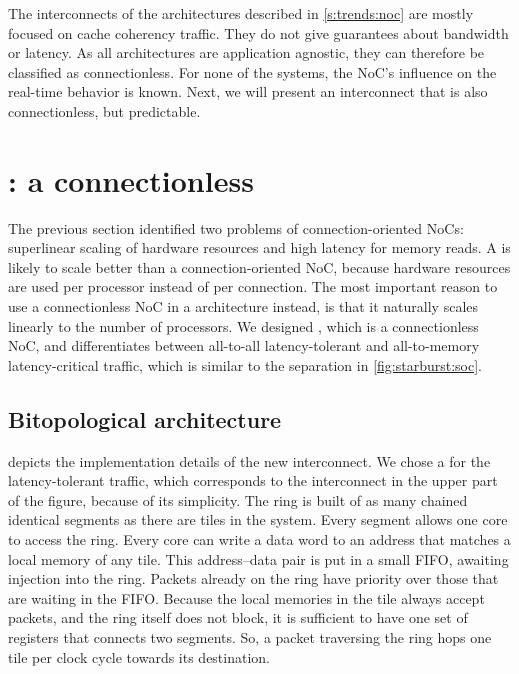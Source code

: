 The interconnects of the architectures described in \cref{s:trends:noc} are mostly focused on cache coherency traffic.
They do not give guarantees about bandwidth or latency.
As all architectures are application agnostic, they can therefore be classified as connectionless.
For none of the systems, the \ac{NoC}'s influence on the real-time behavior is known.
Next, we will present an interconnect that is also connectionless, but predictable.


\section{\Warpfield: a connectionless }
\label{s:hardware:warpfield}

The previous section identified two problems of connection-oriented \acp{NoC}: superlinear scaling of hardware resources and high latency for memory reads.
A   is likely to scale better than a connection-oriented \ac{NoC}, because hardware resources are used per processor instead of per connection.
The most important reason to use a connectionless \ac{NoC} in a  architecture instead, is that it naturally scales linearly to the number of processors.
We designed \Warpfield*, which is a connectionless \ac{NoC}, and differentiates between all-to-all latency-tolerant and all-to-memory latency-critical traffic, which is similar to the separation in \vref{fig:starburst:soc}.

\subsection{Bitopological architecture}
\label{s:hardware:warpfield:setup}

 depicts the implementation details of the new interconnect.
We chose a  for the latency-tolerant traffic, which corresponds to the interconnect in the upper part of the figure, because of its simplicity.
The ring is built of as many chained identical segments as there are tiles in the system.
Every segment allows one core to access the ring.
Every core can write a data word to an address that matches a local memory of any tile.
This address--data pair is put in a small \ac{FIFO}, awaiting injection into the ring.
Packets already on the ring have priority over those that are waiting in the \ac{FIFO}.
Because the local memories in the tile always accept packets, and the ring itself does not block, it is sufficient to have one set of registers that connects two segments.
So, a packet traversing the ring hops one tile per clock cycle towards its destination.

